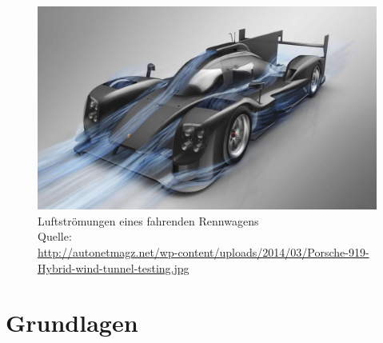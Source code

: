 

\DeclareMathOperator{\sign}{sign}




	\begin{frame}
		\begin{figure}
			\centering
			\includegraphics[scale=0.25]{images/Porsche-919-Hybrid-wind-tunnel-testing.jpg}
			\caption{Luftströmungen eines fahrenden Rennwagens \\ \scriptsize Quelle:\\ \url{http://autonetmagz.net/wp-content/uploads/2014/03/Porsche-919-Hybrid-wind-tunnel-testing.jpg}}
		\end{figure}
	\end{frame}
	
	\frame{\hrule\maketitle\hrule}


	\section{Grundlagen} %
	\label{sec:grundlagen}

